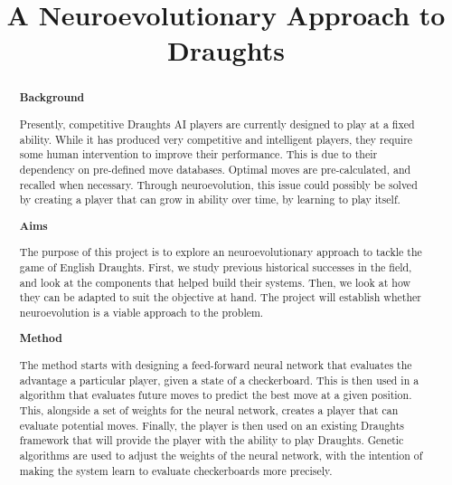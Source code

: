 \documentclass[12pt,a4paper]{article}
\title{A Neuroevolutionary Approach to Draughts}
\author{}
\date{}
\begin{document}
\maketitle


\begin{abstract}


    {\bf Background}

    Presently, competitive Draughts AI players are currently designed to play at a fixed ability. While it has produced very competitive and intelligent players, they require some human intervention to improve their performance. 
    This is due to their dependency on pre-defined move databases. Optimal moves are pre-calculated, and recalled when necessary. Through neuroevolution, this issue could possibly be solved by creating a player that can grow in ability over time, by learning to play itself.
    
    {\bf Aims}

    The purpose of this project is to explore an neuroevolutionary approach to tackle the game of English Draughts. First, we study previous historical successes in the field, and look at the components that helped build their systems. Then, we look at how they can be adapted to suit the objective at hand. The project will establish whether neuroevolution is a viable approach to the problem.
    
    {\bf Method}


    The method starts with designing a feed-forward neural network that evaluates the advantage a particular player, given a state of a checkerboard. This is then used in a algorithm that evaluates future moves to predict the best move at a given position. This, alongside a set of weights for the neural network, creates a player that can evaluate potential moves. Finally, the player is then used on an existing Draughts framework that will provide the player with the ability to play Draughts. Genetic algorithms are used to adjust the weights of the neural network, with the intention of making the system learn to evaluate checkerboards more precisely.


\end{abstract}
\end{document}
